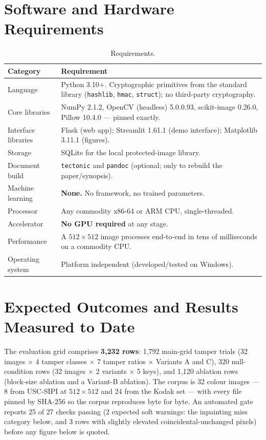 \documentclass[12pt,a4paper]{article}
\begin{document}
\section{Software and Hardware Requirements}

\begin{table}[htbp]
\centering
\caption{Requirements.}
\label{tab:req}
\small
\begin{tabular}{@{}p{1.35in}p{4.0in}@{}}
\toprule
\textbf{Category} & \textbf{Requirement} \\
\midrule
Language & Python 3.10+. Cryptographic primitives from the standard library (\texttt{hashlib}, \texttt{hmac}, \texttt{struct}); no third-party cryptography. \\
Core libraries & NumPy 2.1.2, OpenCV (headless) 5.0.0.93, scikit-image 0.26.0, Pillow 10.4.0 --- pinned exactly. \\
Interface libraries & Flask (web app); Streamlit 1.61.1 (demo interface); Matplotlib 3.11.1 (figures). \\
Storage & SQLite for the local protected-image library. \\
Document build & \texttt{tectonic} and \texttt{pandoc} (optional; only to rebuild the paper/synopsis). \\
Machine learning & \textbf{None.} No framework, no trained parameters. \\
Processor & Any commodity x86-64 or ARM CPU, single-threaded. \\
Accelerator & \textbf{No GPU required} at any stage. \\
Performance & A $512 \times 512$ image processes end-to-end in tens of milliseconds on a commodity CPU. \\
Operating system & Platform independent (developed/tested on Windows). \\
\bottomrule
\end{tabular}
\end{table}

\section{Expected Outcomes and Results Measured to Date}

The evaluation grid comprises \textbf{3{,}232 rows}: 1{,}792 main-grid tamper
trials (32 images $\times$ 4 tamper classes $\times$ 7 tamper ratios $\times$
Variants A and C), 320 null-condition rows (32 images $\times$ 2 variants
$\times$ 5 keys), and 1{,}120 ablation rows (block-size ablation and a Variant-B
ablation). The corpus is 32 colour images --- 8 from USC-SIPI \cite{uscsipi} at
$512\times512$ and 24 from the Kodak set --- with every file pinned by SHA-256
so the corpus reproduces byte for byte. An automated gate reports 25 of 27
checks passing (2 expected soft warnings: the inpainting miss category below,
and 3 rows with slightly elevated coincidental-unchanged pixels) before any
figure below is quoted.
\end{document}
